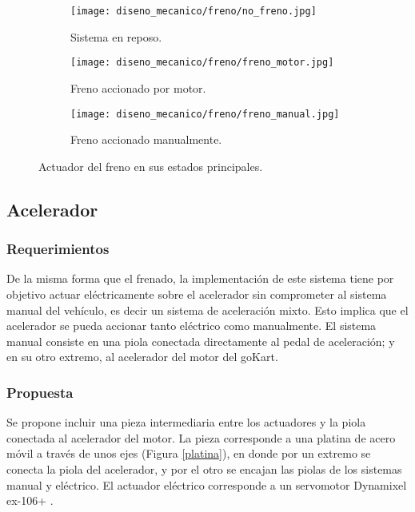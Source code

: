 \begin{figure}[H]
\begin{center}
    \begin{subfigure}{0.3\textwidth}
        \texttt{[image: diseno\_mecanico/freno/no\_freno.jpg]} 
        \caption{Sistema en reposo.}
        \label{res_freno1}
    \end{subfigure}
    \begin{subfigure}{0.3\textwidth}
        \texttt{[image: diseno\_mecanico/freno/freno\_motor.jpg]}
        \caption{Freno accionado por motor.}
        \label{res_freno2}
    \end{subfigure}
    \begin{subfigure}{0.3\textwidth}
        \texttt{[image: diseno\_mecanico/freno/freno\_manual.jpg]}
        \caption{Freno accionado manualmente.}
        \label{res_freno3}
    \end{subfigure}
    \caption{Actuador del freno en sus estados principales.}
    \label{res_freno}
\end{center}
\end{figure}





\subsection{Acelerador}

\subsubsection{Requerimientos}

De la misma forma que el frenado, la implementación de este sistema tiene por objetivo actuar eléctricamente sobre el acelerador sin comprometer al sistema manual del vehículo, es decir un sistema de aceleración mixto. Esto implica que el acelerador se pueda accionar tanto eléctrico como manualmente. 
El sistema manual consiste en una piola conectada directamente al pedal de aceleración; y en su otro extremo, al acelerador del motor del goKart.


\subsubsection{Propuesta}
Se propone incluir una pieza intermediaria entre los actuadores y la piola conectada al acelerador del motor. La pieza corresponde a una platina de acero móvil a través de unos ejes (Figura \ref{platina}), en donde por un extremo se conecta la piola del acelerador, y por el otro se encajan las piolas de los sistemas manual y eléctrico. El actuador eléctrico corresponde a un servomotor Dynamixel ex-106+ \cite{motor_datasheet}.

